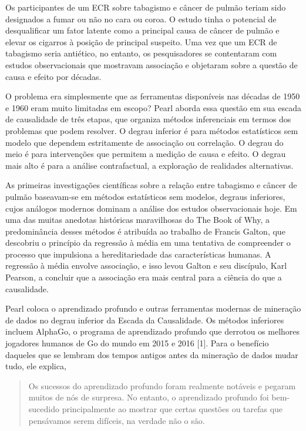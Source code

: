     Os participantes de um ECR sobre tabagismo e câncer de pulmão teriam sido designados a fumar ou não no cara ou coroa. O estudo tinha o potencial de desqualificar um fator latente como a principal causa de câncer de pulmão e elevar os cigarros à posição de principal suspeito. Uma vez que um ECR de tabagismo seria antiético, no entanto, os pesquisadores se contentaram com estudos observacionais que mostravam associação e objetaram sobre a questão de causa e efeito por décadas.

    O problema era simplesmente que as ferramentas disponíveis nas décadas de 1950 e 1960 eram muito limitadas em escopo? Pearl aborda essa questão em sua escada de causalidade de três etapas, que organiza métodos inferenciais em termos dos problemas que podem resolver. O degrau inferior é para métodos estatísticos sem modelo que dependem estritamente de associação ou correlação. O degrau do meio é para intervenções que permitem a medição de causa e efeito. O degrau mais alto é para a análise contrafactual, a exploração de realidades alternativas.

    As primeiras investigações científicas sobre a relação entre tabagismo e câncer de pulmão baseavam-se em métodos estatísticos sem modelos, degraus inferiores, cujos análogos modernos dominam a análise dos estudos observacionais hoje. Em uma das muitas anedotas históricas maravilhosas do The Book of Why, a predominância desses métodos é atribuída ao trabalho de Francis Galton, que descobriu o princípio da regressão à média em uma tentativa de compreender o processo que impulsiona a hereditariedade das características humanas. A regressão à média envolve associação, e isso levou Galton e seu discípulo, Karl Pearson, a concluir que a associação era mais central para a ciência do que a causalidade.

    Pearl coloca o aprendizado profundo e outras ferramentas modernas de mineração de dados no degrau inferior da Escada da Causalidade. Os métodos inferiores incluem AlphaGo, o programa de aprendizado profundo que derrotou os melhores jogadores humanos de Go do mundo em 2015 e 2016 [1]. Para o benefício daqueles que se lembram dos tempos antigos antes da mineração de dados mudar tudo, ele explica,

\begin{quotation}
    Os sucessos do aprendizado profundo foram realmente notáveis e pegaram muitos de nós de surpresa. No entanto, o aprendizado profundo foi bem-sucedido principalmente ao mostrar que certas questões ou tarefas que pensávamos serem difíceis, na verdade não o são.
\end{quotation}

